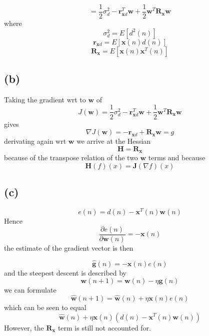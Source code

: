 \documentclass[paper=a4, fontsize=11pt]{scrartcl} %
\begin{document}
$$ = 
\frac{1}{2}  \sigma_d^2 - 
\pmb{r}_{\pmb{x}d}^T\pmb{w} + 
\frac{1}{2}  \pmb{w}^T \pmb{R_x}  \pmb{w}$$
where
$$ \sigma_d^2 = E\left[ d^2(n)\right]$$
$$ \pmb{r}_{\pmb{x}d} = E\left[ \pmb{x}(n) d(n) \right]$$
$$ \pmb{R_x} = E\left[\pmb{x}(n) \pmb{x}^T(n) \right]$$
\subsection{ (b) }
Taking the gradient wrt to $\pmb{w}$ of  
$$
J(\pmb{w}) = 
\frac{1}{2}  \sigma_d^2 - 
\pmb{r}_{\pmb{x}d}^T\pmb{w} + 
\frac{1}{2}  \pmb{w}^T \pmb{R_x}  \pmb{w}$$
gives 
$$
\nabla J(\pmb{w}) = 
- \pmb{r}_{\pmb{x}d} + 
 \pmb{R_x}  \pmb{w} = g$$
 derivating again wrt $\pmb{w}$ we arrive at the Hessian
 $$  \pmb{H} =  \pmb{R_x}$$
 because of the transpose relation of the two $\pmb{w}$ terms and because 
 $$ \pmb{H}(f)(x)=\pmb{J}(\nabla f)(x)$$
\subsection{ (c) }
$$ e(n) = d(n) - \pmb{x}^T(n)\pmb{w}(n)$$
Hence
$$ \frac{\partial e(n)}{\partial \pmb{w}(n)} = -\pmb{x}(n) $$
the estimate of the gradient vector is then 

$$ \pmb{\hat g}(n) = -\pmb{x}(n)e(n) $$
and the steepest descent is described by
$$ \pmb{w}(n+1) = \pmb{w}(n) - \eta\pmb{g}(n)$$
we can formulate 
$$ \pmb{\hat w}(n+1) = \pmb{\hat w}(n) + \eta\pmb{x}(n)e(n) $$
which can be seen to equal 
$$\pmb{\hat w}(n) + \eta\pmb{x}(n)(d(n) - \pmb{x}^T(n)\pmb{w}(n)) $$
However, the $\pmb{R_x}$ term is still not accounted for.
\end{document}
